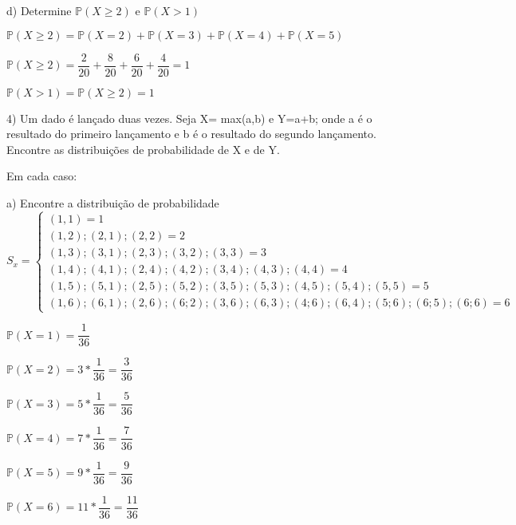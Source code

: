 \documentclass[12pt,a4paper]{article}
\begin{document}
\vspace{1cm}
d) Determine $\mathbb{P}(X\geq{2})$ e $\mathbb{P}(X>1)$
\vspace{0.25cm}
\begin{center}
	$\mathbb{P}(X\geq{2}) = \mathbb{P}(X = 2) + \mathbb{P}(X = 3)+\mathbb{P}(X = 4) + \mathbb{P}(X = 5)$ 
	
	$\mathbb{P}(X\geq{2}) = \dfrac{2}{20}+\dfrac{8}{20}+\dfrac{6}{20}+\dfrac{4}{20} = 1$
	
	\vspace{1cm}
	$\mathbb{P}(X>1) = \mathbb{P}(X\geq{2}) = 1$
\end{center}

\vspace{1cm}
4) Um dado é lançado duas vezes. Seja X= max(a,b) e Y=a+b; onde a é o resultado do primeiro lançamento e b é o resultado do segundo lançamento. Encontre as distribuições de probabilidade de X e de Y.

Em cada caso:

a) Encontre a distribuição de probabilidade
\[
S_{x} =
\begin{cases}
(1,1) = 1 \\
(1,2);(2,1);(2,2) = 2\\
(1,3);(3,1);(2,3);(3,2);(3,3) = 3\\
(1,4);(4,1);(2,4);(4,2);(3,4);(4,3);(4,4) = 4\\
(1,5);(5,1);(2,5);(5,2);(3,5);(5,3);(4,5);(5,4);(5,5) = 5\\
(1,6);(6,1);(2,6);(6;2);(3,6);(6,3);(4;6);(6,4);(5;6);(6;5);(6;6) = 6
\end{cases}
\]
\begin{center}
	\vspace{0.5cm}
	$\mathbb{P}(X=1) = \dfrac{1}{36}$
	
	\vspace{0.5cm}
	$\mathbb{P}(X=2) = 3*\dfrac{1}{36} = \dfrac{3}{36}$
	
	\vspace{0.5cm}
	$\mathbb{P}(X=3) = 5*\dfrac{1}{36} = \dfrac{5}{36}$
	
	\vspace{0.5cm}
	$\mathbb{P}(X=4) = 7*\dfrac{1}{36} = \dfrac{7}{36}$
	
	\vspace{0.5cm}
	$\mathbb{P}(X=5) = 9*\dfrac{1}{36} = \dfrac{9}{36}$
	
	\vspace{0.5cm}
	$\mathbb{P}(X=6) = 11*\dfrac{1}{36} = \dfrac{11}{36}$
\end{center}
\end{document}
